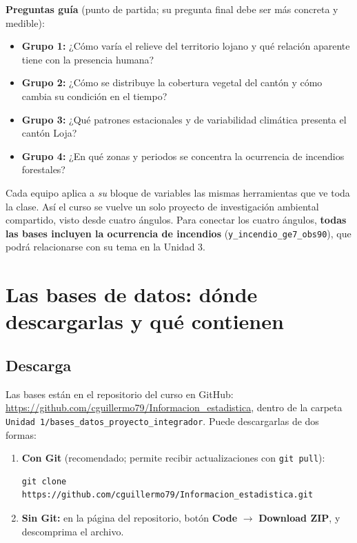 \documentclass[11pt,a4paper]{article}
\begin{document}
\textbf{Preguntas guía} (punto de partida; su pregunta final debe ser más concreta y medible):

\begin{itemize}
  \item \textbf{Grupo 1:} ¿Cómo varía el relieve del territorio lojano y qué relación aparente tiene con la presencia humana?
  \item \textbf{Grupo 2:} ¿Cómo se distribuye la cobertura vegetal del cantón y cómo cambia su condición en el tiempo?
  \item \textbf{Grupo 3:} ¿Qué patrones estacionales y de variabilidad climática presenta el cantón Loja?
  \item \textbf{Grupo 4:} ¿En qué zonas y periodos se concentra la ocurrencia de incendios forestales?
\end{itemize}

\begin{nota}
Cada equipo aplica a \emph{su} bloque de variables las mismas herramientas que ve toda la clase. Así el curso se vuelve un solo proyecto de investigación ambiental compartido, visto desde cuatro ángulos. Para conectar los cuatro ángulos, \textbf{todas las bases incluyen la ocurrencia de incendios} (\nolinkurl{y_incendio_ge7_obs90}), que podrá relacionarse con su tema en la Unidad 3.
\end{nota}

\section{Las bases de datos: dónde descargarlas y qué contienen}

\subsection{Descarga}

Las bases están en el repositorio del curso en GitHub: \url{https://github.com/cguillermo79/Informacion_estadistica}, dentro de la carpeta \nolinkurl{Unidad 1/bases_datos_proyecto_integrador}. Puede descargarlas de dos formas:

\begin{enumerate}
  \item \textbf{Con Git} (recomendado; permite recibir actualizaciones con \texttt{git pull}):
\begin{verbatim}
git clone https://github.com/cguillermo79/Informacion_estadistica.git
\end{verbatim}
  \item \textbf{Sin Git:} en la página del repositorio, botón \textbf{Code} $\rightarrow$ \textbf{Download ZIP}, y descomprima el archivo.
\end{enumerate}
\end{document}

